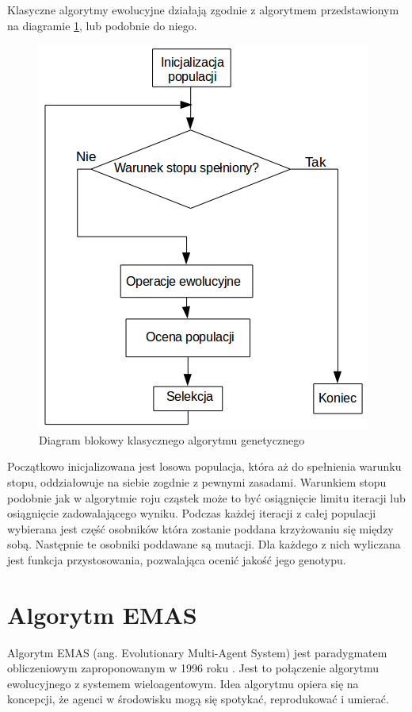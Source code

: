 Klasyczne algorytmy ewolucyjne działają zgodnie z algorytmem przedstawionym na diagramie \ref{fig:GAdiagram}, lub podobnie do niego. 

\begin{figure}[H]
\begin{center} 
\includegraphics[scale=0.6]{tresc/pics/GAdiagram.png}
\caption{Diagram blokowy klasycznego algorytmu genetycznego}
\label{fig:GAdiagram}
\end{center}
\end{figure}

Początkowo inicjalizowana jest losowa populacja, która aż do spełnienia warunku stopu, oddziałowuje na siebie zogdnie z pewnymi zasadami. Warunkiem stopu podobnie jak w algorytmie roju cząstek może to być osiągnięcie limitu iteracji lub osiągnięcie zadowalającego wyniku. Podczas każdej iteracji z całej populacji wybierana jest część osobników która zostanie poddana krzyżowaniu się między sobą. Następnie te osobniki poddawane są mutacji. Dla każdego z nich wyliczana jest funkcja przystosowania, pozwalająca ocenić jakość jego genotypu.

\section{Algorytm EMAS}
\label{sec:emas}

Algorytm EMAS (ang. Evolutionary Multi-Agent System) jest paradygmatem obliczeniowym zaproponowanym w 1996 roku \cite{emas1}. Jest to połączenie algorytmu ewolucyjnego z systemem wieloagentowym. Idea algorytmu opiera się na koncepcji, że agenci w środowisku mogą się spotykać, reprodukować i umierać. 

